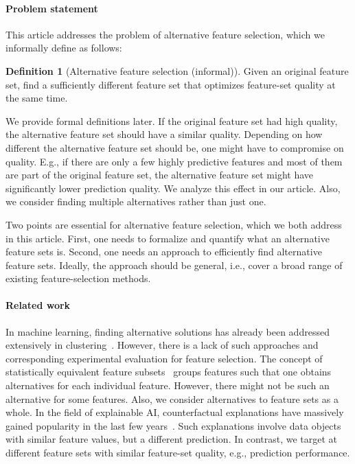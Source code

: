 \documentclass{article}
\theoremstyle{definition}
\newtheorem{definition}{Definition}
\begin{document}
\paragraph{Problem statement}

This article addresses the problem of alternative feature selection, which we informally define as follows:
%
\begin{definition}[Alternative feature selection (informal)]
	Given an original feature set, find a sufficiently different feature set that optimizes feature-set quality at the same time.
	\label{def:alternative-feature-selection}
\end{definition}
%
We provide formal definitions later.
If the original feature set had high quality, the alternative feature set should have a similar quality.
Depending on how different the alternative feature set should be, one might have to compromise on quality.
E.g., if there are only a few highly predictive features and most of them are part of the original feature set, the alternative feature set might have significantly lower prediction quality.
We analyze this effect in our article.
Also, we consider finding multiple alternatives rather than just one.

Two points are essential for alternative feature selection, which we both address in this article.
First, one needs to formalize and quantify what an alternative feature sets is.
Second, one needs an approach to efficiently find alternative feature sets.
Ideally, the approach should be general, i.e., cover a broad range of existing feature-selection methods.

\paragraph{Related work}

In machine learning, finding alternative solutions has already been addressed extensively in clustering~\cite{bae2006coala}.
However, there is a lack of such approaches and corresponding experimental evaluation for feature selection.
The concept of statistically equivalent feature subsets~\cite{lagani2017feature} groups features such that one obtains alternatives for each individual feature.
However, there might not be such an alternative for some features.
Also, we consider alternatives to feature sets as a whole.
In the field of explainable AI, counterfactual explanations have massively gained popularity in the last few years~\cite{verma2020counterfactual, stepin2021survey}.
Such explanations involve data objects with similar feature values, but a different prediction.
In contrast, we target at different feature sets with similar feature-set quality, e.g., prediction performance.
\end{document}
